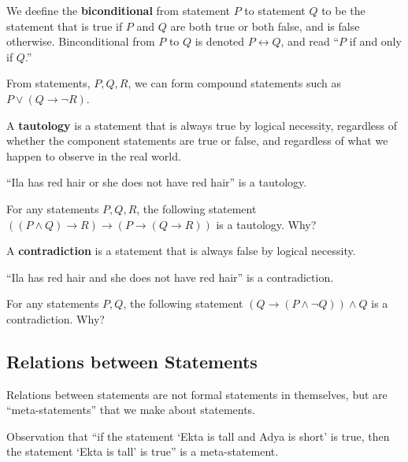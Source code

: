 \documentclass[a4paper,english,12pt]{article}
\begin{document}
\begin{defn}[Biconditional] We deefine the \textbf{biconditional} from statement $P$ to statement $Q$ to be the statement that is true if $P$ and $Q$ are both true or both false, and is false otherwise. Binconditional from $P$ to $Q$ is denoted $P \leftrightarrow Q$, and read ``$P$ if and only if $Q$.'' 
\end{defn}
\begin{exmp} From statements, $P,Q,R$, we can form compound statements such as $P \vee (Q\rightarrow \neg R)$.
\end{exmp}		
\begin{defn}[Tautology] A \textbf{tautology} is a statement that is always true by logical necessity, regardless of whether the component statements are true or false, and regardless of what we happen to observe in the real world. 
\end{defn}	
\begin{exmp} ``Ila has red hair or she does not have red hair'' is a tautology.
\end{exmp}
\begin{exmp} For any statements $P,Q,R$, the following statement $((P \wedge Q)\rightarrow R) \rightarrow (P \rightarrow (Q \rightarrow R))$ is a tautology. Why?
\end{exmp}
\begin{defn}[Contradiction] A \textbf{contradiction} is a statement that is always false by logical necessity.  
\end{defn}
\begin{exmp} ``Ila has red hair and she does not have red hair'' is a contradiction.
\end{exmp}
\begin{exmp} For any statements $P,Q$, the following statement $(Q\rightarrow (P \wedge \neg Q))\wedge Q$ is a contradiction. Why?
\end{exmp}

\subsection{Relations between Statements}
Relations between statements are not formal statements in themselves, but are ``meta-statements'' that we make about statements. 
\begin{exmp} Observation that ``if the statement ‘Ekta is tall and Adya is short’ is true, then the statement ‘Ekta is tall’ is true'' is a meta-statement.
\end{exmp}
\end{document}
